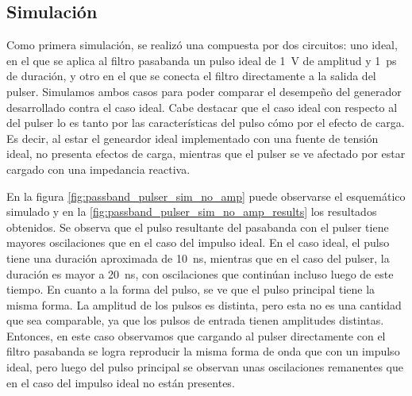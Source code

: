 \subsection{Simulación}

Como primera simulación, se realizó una compuesta por dos circuitos: uno ideal,
en el que se aplica al filtro pasabanda un pulso ideal de \qty{1}{\volt} de
amplitud y \qty{1}{\pico\second} de duración, y otro en el que se conecta el
filtro directamente a la salida del pulser. Simulamos ambos casos para poder
comparar el desempeño del generador desarrollado contra el caso ideal. Cabe
destacar que el caso ideal con respecto al del pulser lo es tanto por las
características del pulso cómo por el efecto de carga. Es decir, al estar el
geneardor ideal implementado con una fuente de tensión ideal, no presenta
efectos de carga, mientras que el pulser se ve afectado por estar cargado con
una impedancia reactiva.

En la figura \ref{fig:passband_pulser_sim_no_amp} puede observarse el
esquemático simulado y en la \ref{fig:passband_pulser_sim_no_amp_results} los
resultados obtenidos. Se observa que el pulso resultante del pasabanda con el
pulser tiene mayores oscilaciones que en el caso del impulso ideal. En el caso
ideal, el pulso tiene una duración aproximada de \qty{10}{\nano\second},
mientras que en el caso del pulser, la duración es mayor a
\qty{20}{\nano\second}, con oscilaciones que continúan incluso luego de este
tiempo. En cuanto a la forma del pulso, se ve que el pulso principal tiene la
misma forma. La amplitud de los pulsos es distinta, pero esta no es una cantidad
que sea comparable, ya que los pulsos de entrada tienen amplitudes distintas.
Entonces, en este caso observamos que cargando al pulser directamente con el
filtro pasabanda se logra reproducir la misma forma de onda que con un impulso
ideal, pero luego del pulso principal se observan unas oscilaciones remanentes
que en el caso del impulso ideal no están presentes.

